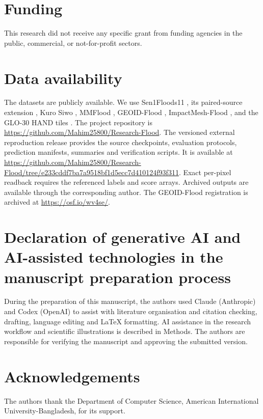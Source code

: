 \documentclass[a4paper,fleqn]{cas-sc}
\begin{document}
\section*{Funding}
This research did not receive any specific grant from funding agencies in the public, commercial, or not-for-profit sectors.

\section*{Data availability}
The datasets are publicly available. We use Sen1Floods11 \citep{bonafilia2020sen1floods11}, its paired-source extension \citep{yadav2023pairedsen1floods11}, Kuro Siwo \citep{bountos2024kurosiwo}, MMFlood \citep{montello2022mmflood}, GEOID-Flood \citep{chiriaco2026geoid}, ImpactMesh-Flood \citep{impactmesh2026}, and the GLO-30 HAND tiles \citep{glo30hand2022}. The project repository is \url{https://github.com/Mahim25800/Research-Flood}. The versioned external reproduction release provides the source checkpoints, evaluation protocols, prediction manifests, summaries and verification scripts. It is available at {\small\url{https://github.com/Mahim25800/Research-Flood/tree/e233cddf7ba7a9518bf1d5ecc7d410124f93f311}}. Exact per-pixel readback requires the referenced labels and score arrays. Archived outputs are available through the corresponding author. The GEOID-Flood registration is archived at \url{https://osf.io/wv4se/}.

\section*{Declaration of generative AI and AI-assisted technologies in the manuscript preparation process}
During the preparation of this manuscript, the authors used Claude (Anthropic) and Codex (OpenAI) to assist with literature organisation and citation checking, drafting, language editing and LaTeX formatting. AI assistance in the research workflow and scientific illustrations is described in Methods. The authors are responsible for verifying the manuscript and approving the submitted version.

\section*{Acknowledgements}
The authors thank the Department of Computer Science, American International University-Bangladesh, for its support.
\end{document}
